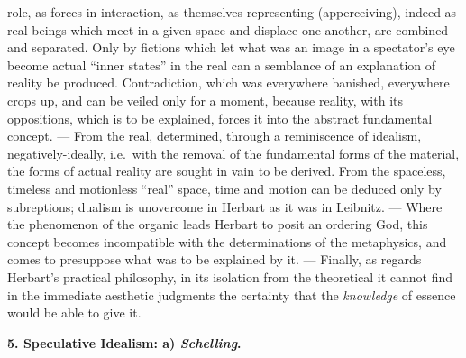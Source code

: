 role, as forces in interaction, as themselves representing
(apperceiving), indeed as real beings which meet in a given space and
displace one another, are combined and separated. Only by fictions
which let what was an image in a spectator's eye become actual ``inner
states'' in the real can a semblance of an explanation of reality be
produced. Contradiction, which was everywhere banished, everywhere
crops up, and can be veiled only for a moment, because reality, with
its oppositions, which is to be explained, forces it into the abstract
fundamental concept. --- From the real, determined, through a
reminiscence of idealism, negatively-ideally, i.e.\ with the removal of
the fundamental forms of the material, the forms of actual reality are
sought in vain to be derived. From the spaceless, timeless and
motionless ``real'' space, time and motion can be deduced only by
subreptions; dualism is unovercome in Herbart as it was in Leibnitz.
--- Where the phenomenon of the organic leads Herbart to posit an
ordering God, this concept becomes incompatible with the determinations
of the metaphysics, and comes to presuppose what was to be explained by
it. --- Finally, as regards Herbart's practical philosophy, in its
isolation from the theoretical it cannot find in the immediate
aesthetic judgments the certainty that the \emph{knowledge} of essence
would be able to give it.

\divrule

\begin{center}
  \textbf{5. Speculative Idealism: a) \emph{Schelling}.}
\end{center}

